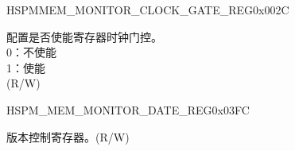 \begin{register}{H}{SPMMEM\_MONITOR\_CLOCK\_GATE\_REG}{0x002C}\label{regdesc:SPMMEMMONITORCLOCKGATEREG}
%
%
\regnewline%
\begin{regdesc}\begin{reglist}
\label{fielddesc:SPMMEMMONITORCLKEN}\item [SPM\_MEM\_MONITOR\_CLK\_EN] 配置是否使能寄存器时钟门控。\\
0：不使能\\
1：使能\\
(R/W)
\end{reglist}\end{regdesc}
\end{register}

\begin{register}{H}{SPM\_MEM\_MONITOR\_DATE\_REG}{0x03FC}\label{regdesc:SPMMEMMONITORDATEREG}
%
%
\regnewline%
\begin{regdesc}\begin{reglist}
\label{fielddesc:SPMMEMMONITORDATE}\item [SPM\_MEM\_MONITOR\_DATE] 版本控制寄存器。(R/W)
\end{reglist}\end{regdesc}
\end{register}